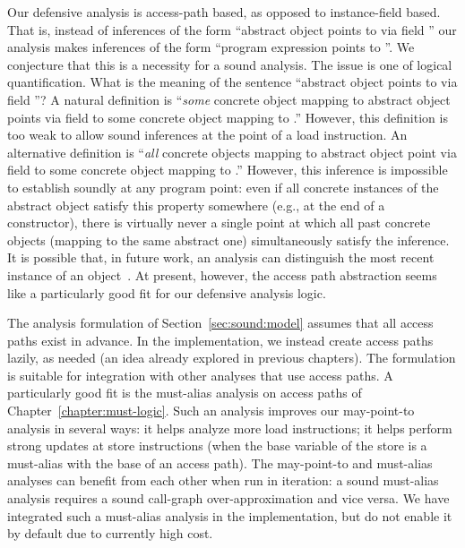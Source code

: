 Our defensive analysis is access-path based, as opposed to instance-field based. That is, instead of inferences of the form ``abstract object  points to  via field '' our analysis makes inferences of the form ``program expression  points to ''. We conjecture that this is a necessity for a sound analysis. The issue is one of logical quantification. What is the meaning of the sentence ``abstract object  points to  via field ''? A natural definition is ``\emph{some} concrete object mapping to abstract object  points via field  to some concrete object mapping to .'' However, this definition is too weak to allow sound inferences at the point of a load instruction. An alternative definition is ``\emph{all} concrete objects mapping to abstract object  point via field  to some concrete object mapping to .'' However, this inference is impossible to establish soundly at any program point: even if all concrete instances of the abstract object satisfy this property somewhere (e.g., at the end of a constructor), there is virtually never a single point at which all past concrete objects (mapping to the same abstract one) simultaneously satisfy the inference. It is possible that, in future work, an analysis can distinguish the most recent instance of an object~\cite{sas:2006:Balakrishnan}. At present, however, the access path abstraction seems like a particularly good fit for our defensive analysis logic.

The analysis formulation of Section~\ref{sec:sound:model} assumes that all access paths exist in advance. In the implementation, we instead create access paths lazily, as needed (an idea already explored in previous chapters). The formulation is suitable for integration with other analyses that use access paths. A particularly good fit is the must-alias analysis on access paths of Chapter~\ref{chapter:must-logic}. Such an analysis improves our may-point-to analysis in several ways: it helps analyze more load instructions; it helps perform strong updates at store instructions (when the base variable of the store is a must-alias with the base of an access path). The may-point-to and must-alias analyses can benefit from each other when run in iteration: a sound must-alias analysis requires a sound call-graph over-approximation and vice versa. We have integrated such a must-alias analysis in the implementation, but do not enable it by default due to currently high cost.


